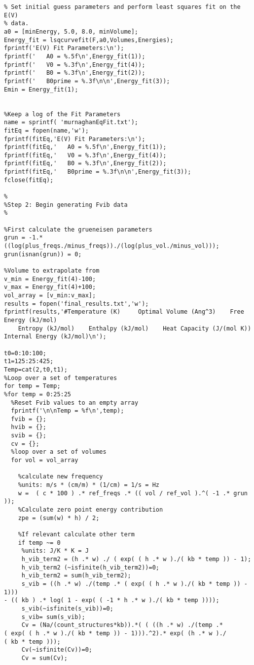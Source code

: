 \documentclass[11pt,letterpaper]{article}
\begin{document}
\begin{spacing}{1.0}
\begin{verbatim}
% Set initial guess parameters and perform least squares fit on the E(V)
% data.
a0 = [minEnergy, 5.0, 8.0, minVolume];
Energy_fit = lsqcurvefit(F,a0,Volumes,Energies);
fprintf('E(V) Fit Parameters:\n');
fprintf('   A0 = %.5f\n',Energy_fit(1));
fprintf('   V0 = %.3f\n',Energy_fit(4));
fprintf('   B0 = %.3f\n',Energy_fit(2));
fprintf('   B0prime = %.3f\n\n',Energy_fit(3));
Emin = Energy_fit(1);


%Keep a log of the Fit Parameters
name = sprintf( 'murnaghanEqFit.txt');
fitEq = fopen(name,'w');
fprintf(fitEq,'E(V) Fit Parameters:\n');
fprintf(fitEq,'   A0 = %.5f\n',Energy_fit(1));
fprintf(fitEq,'   V0 = %.3f\n',Energy_fit(4));
fprintf(fitEq,'   B0 = %.3f\n',Energy_fit(2));
fprintf(fitEq,'   B0prime = %.3f\n\n',Energy_fit(3));
fclose(fitEq);

%
%Step 2: Begin generating Fvib data
%

%First calculate the grueneisen parameters
grun = -1.*((log(plus_freqs./minus_freqs))./(log(plus_vol./minus_vol)));
grun(isnan(grun)) = 0;

%Volume to extrapolate from
v_min = Energy_fit(4)-100;
v_max = Energy_fit(4)+100;
vol_array = [v_min:v_max];
results = fopen('final_results.txt','w');
fprintf(results,'#Temperature (K)     Optimal Volume (Ang^3)    Free Energy (kJ/mol)
    Entropy (kJ/mol)    Enthalpy (kJ/mol)    Heat Capacity (J/(mol K))    
Internal Energy (kJ/mol)\n');

t0=0:10:100;
t1=125:25:425;
Temp=cat(2,t0,t1);
%Loop over a set of temperatures
for temp = Temp;
%for temp = 0:25:25
  %Reset Fvib values to an empty array
  fprintf('\n\nTemp = %f\n',temp);
  fvib = {};
  hvib = {};
  svib = {};
  cv = {};
  %loop over a set of volumes
  for vol = vol_array

    %calculate new frequency
    %units: m/s * (cm/m) * (1/cm) = 1/s = Hz
    w =  ( c * 100 ) .* ref_freqs .* (( vol / ref_vol ).^( -1 .* grun ));
    %Calculate zero point energy contribution
    zpe = (sum(w) * h) / 2;
    
    %If relevant calculate other term
    if temp ~= 0
     %units: J/K * K = J
     h_vib_term2 = (h .* w) ./ ( exp( ( h .* w )./( kb * temp )) - 1);
     h_vib_term2 (~isfinite(h_vib_term2))=0;
     h_vib_term2 = sum(h_vib_term2);
     s_vib = ((h .* w) ./(temp .* ( exp( ( h .* w )./( kb * temp )) - 1))) 
- (( kb ) .* log( 1 - exp( ( -1 * h .* w )./( kb * temp ))));
     s_vib(~isfinite(s_vib))=0;
     s_vib= sum(s_vib);   
     Cv = (Na/(count_structures*kb)).*( ( ((h .* w) ./(temp .* 
( exp( ( h .* w )./( kb * temp )) - 1))).^2).* exp( (h .* w )./
( kb * temp )));
     Cv(~isfinite(Cv))=0;
     Cv = sum(Cv);     
     

\end{verbatim}
\end{spacing}
\end{document}
